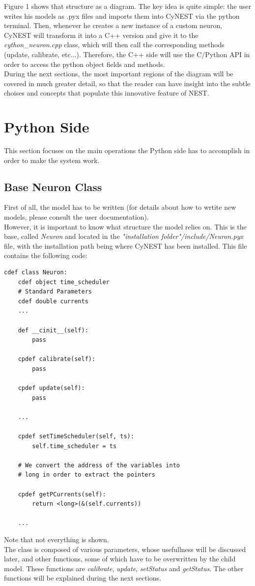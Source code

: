 \documentclass{article}
\begin{document}
Figure 1 shows that structure as a diagram. The key idea is quite simple: the user writes his models as .pyx files and imports them into CyNEST via the python terminal. Then, whenever he creates a new instance of a custom neuron, CyNEST will transform it into a C++ version and give it to the \emph{cython\_neuron.cpp} class, which will then call the corresponding methods (update, calibrate, etc...). Therefore, the C++ side will use the C/Python API in order to access the python object fields and methods.\\

During the next sections, the most important regions of the diagram will be covered in much greater detail, so that the reader can have insight into the subtle choises and concepts that populate this innovative feature of NEST.



\section{Python Side}
This section focuses on the main operations the Python side has to accomplish in order to make the system work.\\

\subsection{Base Neuron Class}
First of all, the model has to be written (for details about how to wrtite new models, please consult the user documentation).\\
However, it is important to know what structure the model relies on. This is the base, called \emph{Neuron} and located in the \emph{"installation folder"/include/Neuron.pyx} file, with the installation path being where CyNEST has been installed. This file contains the following code:
\begin{verbatim}
cdef class Neuron:
    cdef object time_scheduler
    # Standard Parameters
    cdef double currents
    ...
    
    def __cinit__(self):
        pass

    cpdef calibrate(self):
        pass
        
    cpdef update(self):
        pass
        
    ...
        
    cpdef setTimeScheduler(self, ts):
        self.time_scheduler = ts
       
    # We convert the address of the variables into 
    # long in order to extract the pointers

    cpdef getPCurrents(self):
        return <long>(&(self.currents))
        
    ...
\end{verbatim}
Note that not everything is shown.\\
The class is composed of various parameters, whose usefullness will be discussed later, and  other functions, some of which have to be overwritten by the child model. These functions are \emph{calibrate}, \emph{update}, \emph{setStatus} and \emph{getStatus}. The other functions will be explained during the next sections.
\end{document}
